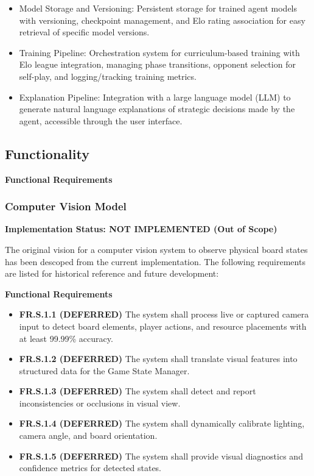 \documentclass{article}
\begin{document}
\begin{itemize}
    \item Model Storage and Versioning: Persistent storage for trained \RL{} agent models with versioning, checkpoint management, and Elo rating association for easy retrieval of specific model versions.

    \item Training Pipeline: Orchestration system for curriculum-based training with Elo league integration, managing phase transitions, opponent selection for self-play, and logging/tracking training metrics.

    \item Explanation Pipeline: Integration with a large language model (LLM) to generate natural language explanations of strategic decisions made by the \AI{} agent, accessible through the user interface.
\end{itemize}


\subsection{Functionality}\label{subsec:functionality}


\textbf{Functional Requirements}

\subsubsection{Computer Vision Model}

\textbf{Implementation Status: NOT IMPLEMENTED (Out of Scope)}

The original vision for a computer vision system to observe physical board states has been descoped from the current implementation. The following requirements are listed for historical reference and future development:

\textbf{Functional Requirements}

\begin{itemize}
  \item \label{FR.S.1.1}\textbf{FR.S.1.1 (DEFERRED)} The system shall process live or captured camera input to detect board elements, player actions, and resource placements with at least 99.99\% accuracy.
  \item \label{FR.S.1.2}\textbf{FR.S.1.2 (DEFERRED)} The system shall translate visual features into structured \GameState{} data for the Game State Manager.
  \item \label{FR.S.1.3}\textbf{FR.S.1.3 (DEFERRED)} The system shall detect and report inconsistencies or occlusions in visual view.
  \item \label{FR.S.1.4}\textbf{FR.S.1.4 (DEFERRED)} The system shall dynamically calibrate lighting, camera angle, and board orientation.
  \item \label{FR.S.1.5}\textbf{FR.S.1.5 (DEFERRED)} The system shall provide visual diagnostics and confidence metrics for detected states.
\end{itemize}
\end{document}
